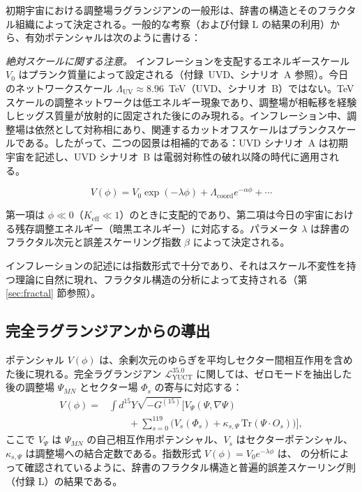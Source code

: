 \documentclass[11pt,a4paper]{article}
\theoremstyle{remark}
\newcommand{\Keff}{K_{\mathrm{eff}}}
\begin{document}
	初期宇宙における調整場ラグランジアンの一般形は、辞書の構造とそのフラクタル組織によって決定される。一般的な考察（および付録 L の結果の利用）から、有効ポテンシャルは次のように書ける：
	
	\noindent\textit{絶対スケールに関する注意。}
	インフレーションを支配するエネルギースケール $V_0$ はプランク質量によって設定される（付録~UVD、シナリオ~A 参照）。今日のネットワークスケール $\Lambda_{\mathrm{UV}} \approx 8.96$~TeV（UVD、シナリオ~B）ではない。TeV スケールの調整ネットワークは低エネルギー現象であり、調整場が相転移を経験しヒッグス質量が放射的に固定された後にのみ現れる。インフレーション中、調整場は依然として対称相にあり、関連するカットオフスケールはプランクスケールである。したがって、二つの図景は相補的である：UVD シナリオ~A は初期宇宙を記述し、UVD シナリオ~B は電弱対称性の破れ以降の時代に適用される。
	
	\begin{equation}
		V(\phi) = V_0 \exp\left( -\lambda \phi \right) + \Lambda_{\mathrm{coord}} e^{-\alpha \phi} + \cdots
		\label{eq:potential}
	\end{equation}
	
	第一項は $\phi \ll 0$（$\Keff \ll 1$）のときに支配的であり、第二項は今日の宇宙における残存調整エネルギー（暗黒エネルギー）に対応する。パラメータ $\lambda$ は辞書のフラクタル次元と誤差スケーリング指数 $\beta$ によって決定される。
	
	インフレーションの記述には指数形式で十分であり、それはスケール不変性を持つ理論に自然に現れ、フラクタル構造の分析によって支持される（第 \ref{sec:fractal} 節参照）。
	
	\subsection{完全ラグランジアンからの導出}
	
	ポテンシャル $V(\phi)$ は、余剰次元のゆらぎを平均しセクター間相互作用を含めた後に現れる。完全ラグランジアン $\mathcal{L}_{\text{YUCT}}^{35.0}$ に関しては、ゼロモードを抽出した後の調整場 $\Psi_{MN}$ とセクター場 $\Phi_s$ の寄与に対応する：
	\begin{align}
		V(\phi) = &\int d^{15}Y \sqrt{-G^{(15)}} \Big[ V_{\Psi}(\Psi,\nabla\Psi) \nonumber\\
		&\qquad + \sum_{s=0}^{119} \big( V_s(\Phi_s) + \kappa_{s,\Psi}\,\mathrm{Tr}(\Psi\cdot O_s) \big) \Big],
	\end{align}
	ここで $V_{\Psi}$ は $\Psi_{MN}$ の自己相互作用ポテンシャル、$V_s$ はセクターポテンシャル、$\kappa_{s,\Psi}$ は調整場への結合定数である。指数形式 $V(\phi)=V_0 e^{-\lambda\phi}$ は、\cite{Yakushev2026} の分析によって確認されているように、辞書のフラクタル構造と普遍的誤差スケーリング則（付録 L）の結果である。
	
\end{document}
